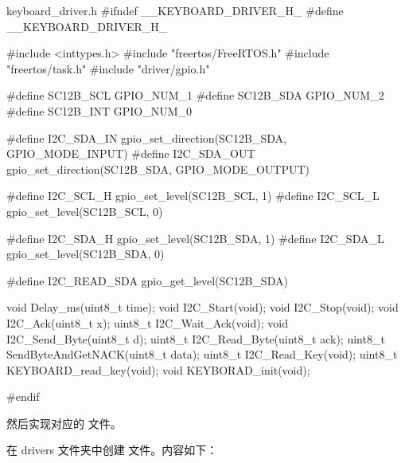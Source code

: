\documentclass[lang=cn,newtx,10pt,scheme=chinese]{elegantbook}
\begin{document}
\begin{mycode}{keyboard\_driver.h}
#ifndef __KEYBOARD_DRIVER_H_
#define __KEYBOARD_DRIVER_H_

#include <inttypes.h>
#include "freertos/FreeRTOS.h"
#include "freertos/task.h"
#include "driver/gpio.h"

#define SC12B_SCL GPIO_NUM_1
#define SC12B_SDA GPIO_NUM_2
#define SC12B_INT GPIO_NUM_0

#define I2C_SDA_IN gpio_set_direction(SC12B_SDA, GPIO_MODE_INPUT)
#define I2C_SDA_OUT gpio_set_direction(SC12B_SDA, GPIO_MODE_OUTPUT)

#define I2C_SCL_H gpio_set_level(SC12B_SCL, 1)
#define I2C_SCL_L gpio_set_level(SC12B_SCL, 0)

#define I2C_SDA_H gpio_set_level(SC12B_SDA, 1)
#define I2C_SDA_L gpio_set_level(SC12B_SDA, 0)

#define I2C_READ_SDA gpio_get_level(SC12B_SDA)

void Delay_ms(uint8_t time);
void I2C_Start(void);
void I2C_Stop(void);
void I2C_Ack(uint8_t x);
uint8_t I2C_Wait_Ack(void);
void I2C_Send_Byte(uint8_t d);
uint8_t I2C_Read_Byte(uint8_t ack);
uint8_t SendByteAndGetNACK(uint8_t data);
uint8_t I2C_Read_Key(void);
uint8_t KEYBOARD_read_key(void);
void KEYBORAD_init(void);

#endif
\end{mycode}

然后实现对应的  文件。

在 drivers 文件夹中创建  文件。内容如下：
\end{document}
